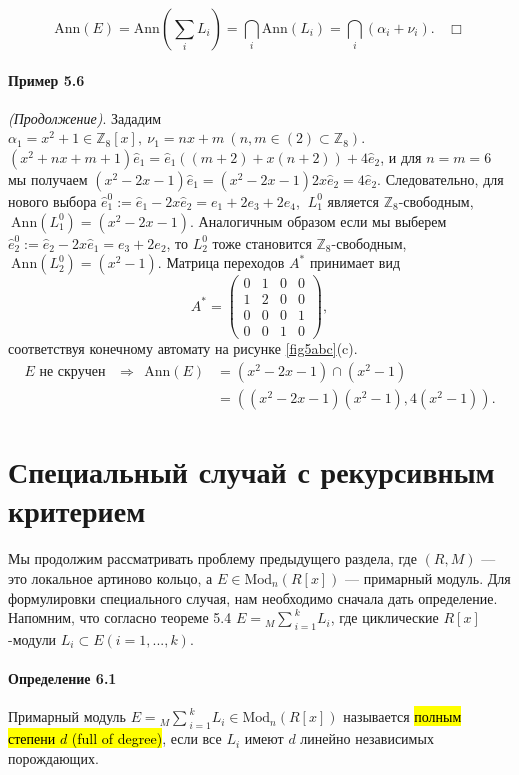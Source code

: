 \documentclass[a4paper,12pt]{article}
\newcommand{\dirsummod}[1]{{_{{#1}}\!\!\sum}}
\newcommand{\hatei}[1]{\hat{e}_{#1}}
\newcommand{\Ann}{\text{Ann}}
\newcommand{\Mod}{\text{Mod}}
\begin{document}
$$
\Ann(E) = \Ann\left(\sum_i L_i \right) = \bigcap_i \Ann(L_i) = \bigcap_i (\alpha_i + \nu_i). ~~~~ \Box
$$

\paragraph{Пример 5.6} \textit{(Продолжение)}.
Зададим $\alpha_1 = x^2 + 1 \in \mathbb{Z}_8[x],~ \nu_1 = nx + m ~ (n, m \in (2) \subset \mathbb{Z}_8)$. $(x^2 + nx + m + 1)\hatei{1} = \hatei{1} ((m+2) + x(n+2)) + 4 \hatei{2}$, и для $n = m = 6$ мы получаем $(x^2 - 2x - 1)\hatei{1} = (x^2 - 2x - 1) 2x \hatei{2} = 4 \hatei{2}$. Следовательно, для нового выбора $\hatei{1}^0 := \hatei{1} - 2 x \hatei{2} = e_1 + 2 e_3 + 2 e_4$, $~L_1^0$ является $\mathbb{Z}_8$-свободным, $~\Ann(L_1^0) = (x^2 - 2x - 1)$. Аналогичным образом если мы выберем $\hatei{2}^0 := \hatei{2} - 2x \hatei{1} = e_3 + 2 e_2$, то $L_2^0$ тоже становится $\mathbb{Z}_8$-свободным, $~\Ann(L_2^0) = (x^2 - 1)$. Матрица переходов $A^*$ принимает вид $$ A^* = \begin{pmatrix}
	0 & 1 & 0 & 0 \\
	1 & 2 & 0 & 0 \\
	0 & 0 & 0 & 1 \\
	0 & 0 & 1 & 0
\end{pmatrix},$$ соответствуя конечному автомату на рисунке \ref{fig5abc}(c).
$$
\begin{aligned}
E \text{ не скручен } ~~ \Rightarrow ~~ \Ann(E) & = (x^2 - 2x -1) \cap (x^2 - 1) \\
& = ((x^2 - 2x -1)(x^2 - 1), 4(x^2 - 1)).
\end{aligned}
$$

\section{Специальный случай с рекурсивным критерием}

Мы продолжим рассматривать проблему предыдущего раздела, где $(R, M)$ --- это локальное артиново кольцо, а $E \in \Mod_n (R[x])$ --- примарный модуль. Для формулировки специального случая, нам необходимо сначала дать определение. Напомним, что согласно теореме 5.4 $E = \dirsummod{M}_{i=1}^k L_i$, где циклические $R[x]$-модули $L_i \subset E (i = 1, ..., k)$.


\paragraph{Определение 6.1}
Примарный модуль $E = \dirsummod{M}_{i=1}^k L_i \in \Mod_n (R[x])$ называется \hl{полным степени $d$ (full of degree)}, если все $L_i$ имеют $d$ линейно независимых порождающих. \\
\end{document}
